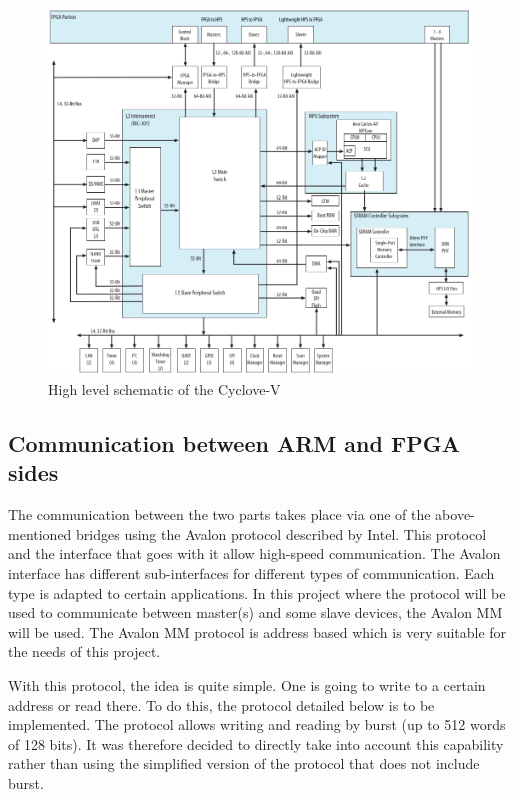 \documentclass[12pt]{article}
\begin{document}
\begin{figure}[ht!]
  \center
  \includegraphics[width=\linewidth]{"res/board/board_schematic.png"}
  \caption{High level schematic of the Cyclove-V}
  \label{fig:de10nano_schematic}
\end{figure}

\subsection{Communication between ARM and FPGA sides}

The communication between the two parts takes place via one of the above-mentioned bridges using the Avalon protocol described by Intel. This protocol and the interface that goes with it allow high-speed communication. The Avalon interface has different sub-interfaces for different types of communication. Each type is adapted to certain applications. In this project where the protocol will be used to communicate between master(s) and some slave devices, the Avalon MM will be used. The Avalon MM protocol is address based which is very suitable for the needs of this project.

\vspace{12pt}
With this protocol, the idea is quite simple. One is going to write to a certain address or read there. To do this, the protocol detailed below is to be implemented. The protocol allows writing and reading by burst (up to 512 words of 128 bits). It was therefore decided to directly take into account this capability rather than using the simplified version of the protocol that does not include burst.
\end{document}
